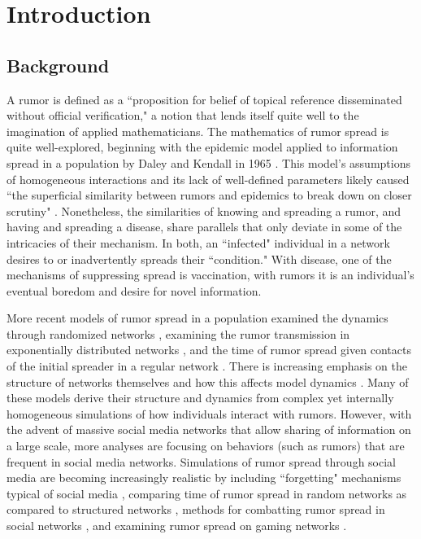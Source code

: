\section{Introduction } 
\label{sec:introduction} 

\subsection{Background}
\label{subsec:background}

            A rumor is defined as a ``proposition for belief of topical reference disseminated without official verification," \cite{knapp-1944} a notion that lends itself quite well to the imagination of applied mathematicians. The mathematics of rumor spread is quite well-explored, beginning with the epidemic model applied to information spread in a population by Daley and Kendall in 1965 \cite{daley-1965}. This model's assumptions of homogeneous interactions and its lack of well-defined parameters likely caused ``the superficial similarity between rumors and epidemics to break down on closer scrutiny" \cite{daley-1965}. Nonetheless, the similarities of knowing and spreading a rumor, and having and spreading a disease, share parallels that only deviate in some of the intricacies of their mechanism. In both, an ``infected" individual in a network desires to or inadvertently spreads their ``condition." With disease, one of the mechanisms of suppressing spread is vaccination, with rumors it is an individual's eventual boredom and desire for novel information.
            
More recent models of rumor spread in a population examined the dynamics through randomized networks \cite{karp-2000}, examining the rumor transmission in exponentially distributed networks \cite{moreno-2004}, and the time of rumor spread given contacts of the initial spreader in a regular network \cite{fount-2010}. There is increasing emphasis on the structure of networks themselves and how this affects model dynamics \cite{zhang-2013, pellis-2015, pellis-2012, ball-2010, zhou-2007}. Many of these models derive their structure and dynamics from complex yet internally homogeneous simulations of how individuals interact with rumors. However, with the advent of massive social media networks that allow sharing of information on a large scale, more analyses are focusing on behaviors (such as rumors) that are frequent in social media networks. Simulations of rumor spread through social media are becoming increasingly realistic by including ``forgetting" mechanisms typical of social media \cite{zhao-2011}, comparing time of rumor spread in random networks as compared to structured networks \cite{liu-2011}, methods for combatting rumor spread in social networks \cite{tripathy-2010}, and examining rumor spread on gaming networks \cite{grab-2008}.

